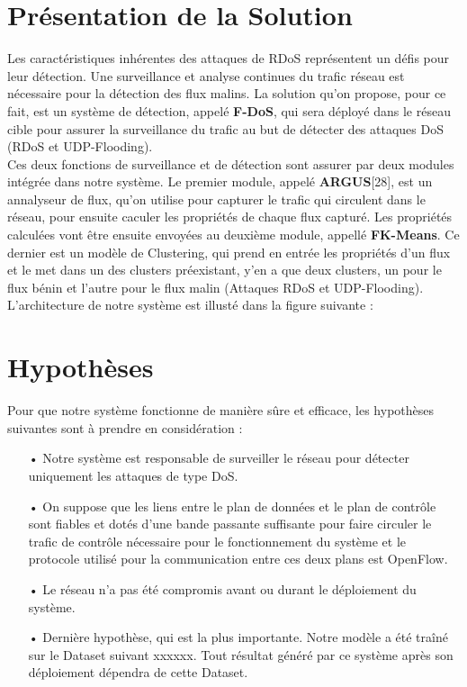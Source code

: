 \section{Présentation de la Solution}
Les caractéristiques inhérentes des attaques de RDoS représentent un défis pour leur détection. Une surveillance et analyse continues du trafic réseau est nécessaire pour la détection des flux malins. La solution qu'on propose, pour ce fait, est un système de détection, appelé \textbf{F-DoS}, qui sera déployé dans le réseau cible pour assurer la surveillance du trafic au but de détecter des attaques DoS (RDoS et UDP-Flooding).\\

Ces deux fonctions de surveillance et de détection sont assurer par deux modules intégrée dans notre système. Le premier module, appelé \textbf{ARGUS}[28], est un annalyseur de flux, qu'on utilise pour capturer le trafic qui circulent dans le réseau, pour ensuite caculer les propriétés de chaque flux capturé. Les propriétés calculées vont être ensuite envoyées au deuxième module, appellé \textbf{FK-Means}. Ce dernier est un modèle de Clustering, qui prend en entrée les propriétés d'un flux et le met dans un des clusters préexistant, y'en a que deux clusters, un  pour le flux bénin et l'autre pour le flux malin (Attaques RDoS et UDP-Flooding).\\

L'architecture de notre système est illusté dans la figure suivante : \\


\section{Hypothèses}
Pour que notre système fonctionne de manière sûre et efficace, les hypothèses suivantes sont à prendre en considération :\\
\begin{itemize}
\item[•] Notre système est responsable de surveiller le réseau pour détecter uniquement les attaques de type DoS.\\
\item[•] On suppose que les liens entre le plan de données et le plan de contrôle sont fiables et dotés d’une bande passante suffisante pour faire circuler le trafic de contrôle nécessaire pour le fonctionnement du système et le protocole utilisé pour la communication entre ces deux plans est OpenFlow.\\
\item[•] Le réseau n’a pas été compromis avant ou durant le déploiement du système.\\
\item[•] Dernière hypothèse, qui est la plus importante. Notre modèle a été traîné sur le Dataset suivant xxxxxx. Tout résultat généré par ce système après son déploiement dépendra de cette Dataset.
\end{itemize}

 